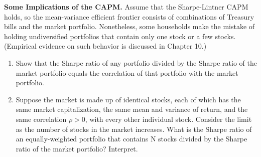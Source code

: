 \documentclass[11pt,green,twocol,citestyle=authoryear, bibstyle=authoryear]{elegantbook}
\begin{document}
\begin{problem}
    \textbf{Some Implications of the CAPM.} Assume that the Sharpe-Lintner CAPM holds, so the mean-variance efficient frontier consists of combinations of Treasury bills and the market portfolio. Nonetheless, some households make the mistake of holding undiversified portfolios that contain only one stock or a few stocks. (Empirical evidence on such behavior is discussed in Chapter 10.)
    \begin{enumerate}
        \item Show that the Sharpe ratio of any portfolio divided by the Sharpe ratio of the market
        portfolio equals the correlation of that portfolio with the market portfolio.
        \item Suppose the market is made up of identical stocks, each of which has the same market capitalization, the same mean and variance of return, and the same correlation $ \rho > 0 $, with every other individual stock. Consider the limit as the number of stocks
        in the market increases. What is the Sharpe ratio of an equally-weighted portfolio
        that contains N stocks divided by the Sharpe ratio of the market portfolio? Interpret.
    \end{enumerate}
\end{problem}
\end{document}
